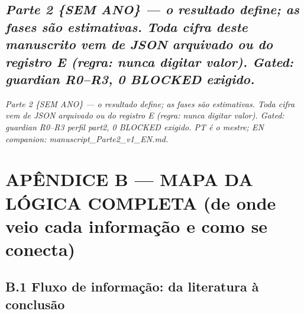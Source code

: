 \documentclass[
  10pt,
]{article}
\begin{document}
\hypertarget{parte-2-sem-ano-o-resultado-define-as-fases-suxe3o-estimativas.-toda-cifra-deste-manuscrito-vem-de-json-arquivado-ou-do-registro-e-regra-nunca-digitar-valor.-gated-guardian-r0r3-0-blocked-exigido.}{%
\subsection{\texorpdfstring{\emph{Parte 2 \{SEM ANO\} --- o resultado
define; as fases são estimativas. Toda cifra deste manuscrito vem de
JSON arquivado ou do registro E (regra: nunca digitar valor). Gated:
guardian R0--R3, 0 BLOCKED
exigido.}}{Parte 2 \{SEM ANO\} --- o resultado define; as fases são estimativas. Toda cifra deste manuscrito vem de JSON arquivado ou do registro E (regra: nunca digitar valor). Gated: guardian R0--R3, 0 BLOCKED exigido.}}\label{parte-2-sem-ano-o-resultado-define-as-fases-suxe3o-estimativas.-toda-cifra-deste-manuscrito-vem-de-json-arquivado-ou-do-registro-e-regra-nunca-digitar-valor.-gated-guardian-r0r3-0-blocked-exigido.}}

\emph{Parte 2 \{SEM ANO\} --- o resultado define; as fases são
estimativas. Toda cifra vem de JSON arquivado ou do registro E (regra:
nunca digitar valor). Gated: guardian R0--R3 perfil part2, 0 BLOCKED
exigido. PT é o mestre; EN companion: manuscript\_Parte2\_v1\_EN.md.}

\hypertarget{apuxeandice-b-mapa-da-luxf3gica-completa-de-onde-veio-cada-informauxe7uxe3o-e-como-se-conecta}{%
\section{APÊNDICE B --- MAPA DA LÓGICA COMPLETA (de onde veio cada
informação e como se
conecta)}\label{apuxeandice-b-mapa-da-luxf3gica-completa-de-onde-veio-cada-informauxe7uxe3o-e-como-se-conecta}}

\hypertarget{b.1-fluxo-de-informauxe7uxe3o-da-literatura-uxe0-conclusuxe3o}{%
\subsection{B.1 Fluxo de informação: da literatura à
conclusão}\label{b.1-fluxo-de-informauxe7uxe3o-da-literatura-uxe0-conclusuxe3o}}
\end{document}
